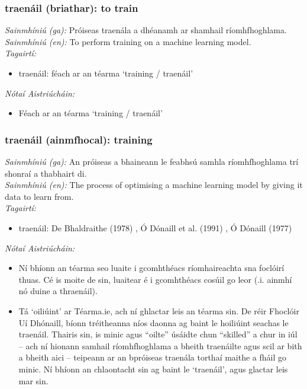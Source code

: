 \subsubsection*{traenáil (briathar): to train}
 \noindent \textit{Sainmhíniú (ga):} Próiseas traenála a dhéanamh ar shamhail ríomhfhoghlama.
\\
 \noindent \textit{Sainmhíniú (en):} To perform training on a machine learning model.
\\
 \noindent \textit{Tagairtí:}
\begin{itemize}
	\item traenáil: féach ar an téarma `training / traenáil'
\end{itemize}

 \noindent \textit{Nótaí Aistriúcháin:}
\begin{itemize}
	\item Féach ar an téarma `training / traenáil'
\end{itemize}


\subsubsection*{traenáil (ainmfhocal): training}
 \noindent \textit{Sainmhíniú (ga):} An próiseas a bhaineann le feabhsú samhla ríomhfhoghlama trí shonraí a thabhairt di.
\\
 \noindent \textit{Sainmhíniú (en):} The process of optimising a machine learning model by giving it data to learn from.
\\
 \noindent \textit{Tagairtí:}
\begin{itemize}
	\item traenáil: De Bhaldraithe (1978) \cite{de-bhaldraithe}, Ó Dónaill et al. (1991) \cite{focloir-beag}, Ó Dónaill (1977) \cite{odonaill}
\end{itemize}

 \noindent \textit{Nótaí Aistriúcháin:}
\begin{itemize}
	\item Ní bhíonn an téarma seo luaite i gcomhthéacs ríomhaireachta sna foclóirí thuas. Cé is moite de sin, luaitear é i gcomhthéacs cosúil go leor (.i. ainmhí nó duine a thraenáil).
	\item Tá `oiliúint' ar Téarma.ie, ach ní ghlactar leis an téarma sin. De réir Fhoclóir Uí Dhónaill, bíonn tréitheanna níos daonna ag baint le hoiliúint seachas le traenáil. Thairis sin, is minic agus “oilte” úsáidte chun “skilled” a chur in iúl -- ach ní hionann samhail ríomhfhoghlama a bheith traenáilte agus scil ar bith a bheith aici -- teipeann ar an bpróiseas traenála torthaí maithe a fháil go minic. Ní bhíonn an chlaontacht sin ag baint le `traenáil', agus glactar leis mar sin.
\end{itemize}


